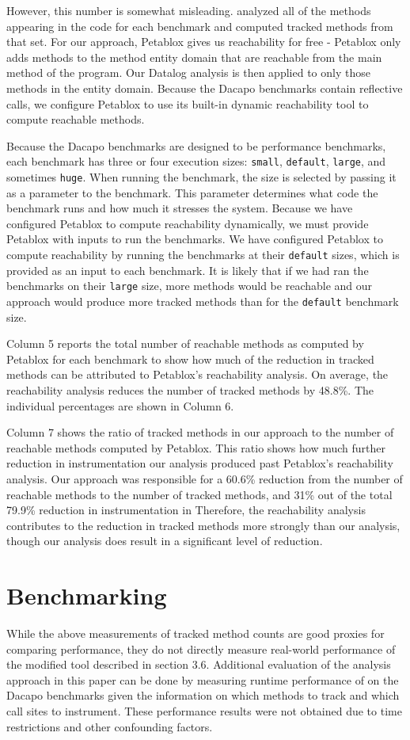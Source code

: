 However, this number is somewhat misleading. \phosphorpi{} analyzed
all of the methods appearing in the code for each benchmark and
computed tracked methods from that set. For our approach, Petablox
gives us reachability for free - Petablox only adds methods to the
method entity domain that are reachable from the main method of the
program. Our Datalog analysis is then applied to only those methods in
the entity domain. Because the Dacapo benchmarks contain reflective
calls, we configure Petablox to use its built-in dynamic reachability
tool to compute reachable methods.

Because the Dacapo benchmarks are designed to be performance
benchmarks, each benchmark has three or four execution sizes:
\texttt{small}, \texttt{default}, \texttt{large}, and sometimes
\texttt{huge}. When running the benchmark, the size is selected by
passing it as a parameter to the benchmark. This parameter determines
what code the benchmark runs and how much it stresses the
system. Because we have configured Petablox to compute reachability
dynamically, we must provide Petablox with inputs to run the
benchmarks. We have configured Petablox to compute reachability by
running the benchmarks at their \texttt{default} sizes, which is
provided as an input to each benchmark. It is likely that if we had
ran the benchmarks on their \texttt{large} size, more methods would be
reachable and our approach would produce more tracked methods than for
the \texttt{default} benchmark size.

Column 5 reports the total number of reachable methods as computed by
Petablox for each benchmark to show how much of the reduction in
tracked methods can be attributed to Petablox's reachability
analysis. On average, the reachability analysis reduces the number of
tracked methods by 48.8\%. The individual percentages are shown in
Column 6.

Column 7 shows the ratio of tracked methods in our approach to the
number of reachable methods computed by Petablox. This ratio shows how
much further reduction in instrumentation our analysis produced past
Petablox's reachability analysis. Our approach was responsible for a
60.6\% reduction from the number of reachable methods to the number of
tracked methods, and 31\% out of the total 79.9\% reduction in
instrumentation in \phosphorpi{} Therefore, the reachability
analysis contributes to the reduction in tracked methods more strongly
than our analysis, though our analysis does result in a significant
level of reduction.

\section{Benchmarking \phosphor{}}
While the above measurements of tracked method counts are good proxies
for comparing performance, they do not directly measure real-world
performance of the modified \phosphor{} tool described in section
3.6. Additional evaluation of the analysis approach in this paper can
be done by measuring runtime performance of \phosphor{} on the Dacapo
benchmarks given the information on which methods to track and which
call sites to instrument. These performance results were not obtained
due to time restrictions and other confounding factors.
